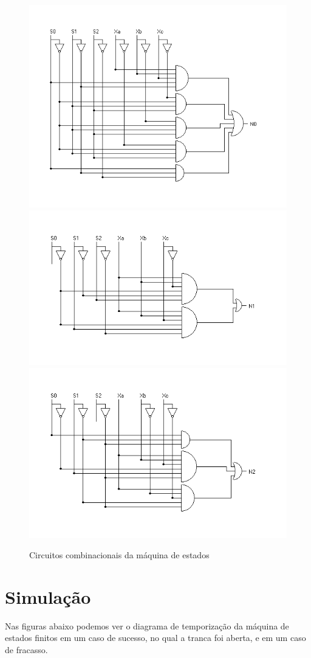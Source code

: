 \documentclass[12pt,a4paper]{article}
\begin{document}
\begin{figure}[!h]
\begin{center}
\includegraphics[width=.65\textwidth]{n0.png}
\includegraphics[width=.65\textwidth]{n1.png}
\includegraphics[width=.65\textwidth]{n2.png}
\end{center}
\caption{Circuitos combinacionais da máquina de estados}
\label{fig4}
\end{figure}

\section{Simulação}

Nas figuras abaixo podemos ver o diagrama de temporização da máquina de estados finitos em um caso de sucesso, no qual a tranca foi aberta, e em um caso de fracasso.
\end{document}
